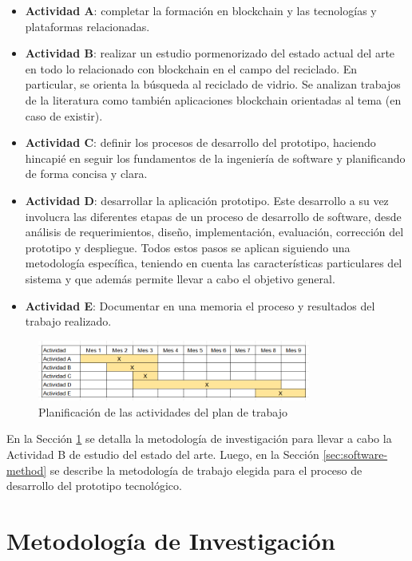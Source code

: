 \begin{itemize}
	\item \textbf{Actividad A}: completar la formación en blockchain y las tecnologías y plataformas relacionadas.
	\item \textbf{Actividad B}: realizar un estudio pormenorizado del estado actual del arte en todo lo relacionado con blockchain en el campo del reciclado. En particular, se orienta la búsqueda al reciclado de vidrio. Se analizan trabajos de la literatura como también aplicaciones blockchain orientadas al tema (en caso de existir).
	\item \textbf{Actividad C}: definir los procesos de desarrollo del prototipo, haciendo hincapié en seguir los fundamentos de la ingeniería de software y planificando de forma concisa y clara.
	\item \textbf{Actividad D}: desarrollar la aplicación prototipo. Este desarrollo a su vez involucra las diferentes etapas de un proceso de desarrollo de software, desde análisis de requerimientos, diseño, implementación, evaluación, corrección del prototipo y despliegue. Todos estos pasos se aplican siguiendo una metodología específica, teniendo en cuenta las características particulares del sistema y que además permite llevar a cabo el objetivo general.
	\item \textbf{Actividad E}: Documentar en una memoria el proceso y resultados del trabajo realizado.
\end{itemize}

\begin{figure}[!htpb]
    \centering
    \includegraphics[width=0.8\textwidth]{Figures/activities-plan.png}
    \caption{Planificación de las actividades del plan de trabajo}
    \label{fig:activities-plan}
\end{figure}

En la Sección \ref{sec:research-method} se detalla la metodología de investigación para llevar a cabo la Actividad B de estudio del estado del arte. Luego, en la Sección \ref{sec:software-method} se describe la metodología de trabajo elegida para el proceso de desarrollo del prototipo tecnológico.

\section{Metodología de Investigación}
\label{sec:research-method}

